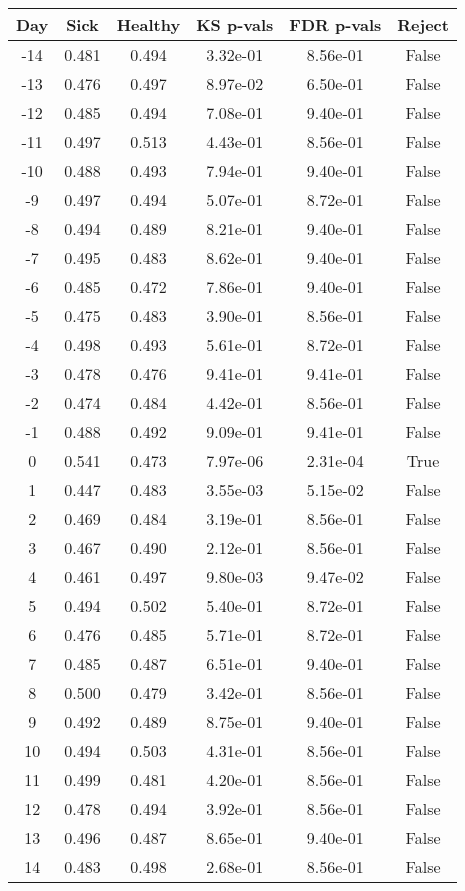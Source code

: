 \begin{tabular}{c|c|c|c|c|c}
Day &  Sick & Healthy &  KS p-vals & FDR p-vals & Reject\\
\hline
-14 & 0.481 &   0.494 &   3.32e-01 &   8.56e-01 &  False\\
-13 & 0.476 &   0.497 &   8.97e-02 &   6.50e-01 &  False\\
-12 & 0.485 &   0.494 &   7.08e-01 &   9.40e-01 &  False\\
-11 & 0.497 &   0.513 &   4.43e-01 &   8.56e-01 &  False\\
-10 & 0.488 &   0.493 &   7.94e-01 &   9.40e-01 &  False\\
 -9 & 0.497 &   0.494 &   5.07e-01 &   8.72e-01 &  False\\
 -8 & 0.494 &   0.489 &   8.21e-01 &   9.40e-01 &  False\\
 -7 & 0.495 &   0.483 &   8.62e-01 &   9.40e-01 &  False\\
 -6 & 0.485 &   0.472 &   7.86e-01 &   9.40e-01 &  False\\
 -5 & 0.475 &   0.483 &   3.90e-01 &   8.56e-01 &  False\\
 -4 & 0.498 &   0.493 &   5.61e-01 &   8.72e-01 &  False\\
 -3 & 0.478 &   0.476 &   9.41e-01 &   9.41e-01 &  False\\
 -2 & 0.474 &   0.484 &   4.42e-01 &   8.56e-01 &  False\\
 -1 & 0.488 &   0.492 &   9.09e-01 &   9.41e-01 &  False\\
  0 & 0.541 &   0.473 &   7.97e-06 &   2.31e-04 &   True\\
  1 & 0.447 &   0.483 &   3.55e-03 &   5.15e-02 &  False\\
  2 & 0.469 &   0.484 &   3.19e-01 &   8.56e-01 &  False\\
  3 & 0.467 &   0.490 &   2.12e-01 &   8.56e-01 &  False\\
  4 & 0.461 &   0.497 &   9.80e-03 &   9.47e-02 &  False\\
  5 & 0.494 &   0.502 &   5.40e-01 &   8.72e-01 &  False\\
  6 & 0.476 &   0.485 &   5.71e-01 &   8.72e-01 &  False\\
  7 & 0.485 &   0.487 &   6.51e-01 &   9.40e-01 &  False\\
  8 & 0.500 &   0.479 &   3.42e-01 &   8.56e-01 &  False\\
  9 & 0.492 &   0.489 &   8.75e-01 &   9.40e-01 &  False\\
 10 & 0.494 &   0.503 &   4.31e-01 &   8.56e-01 &  False\\
 11 & 0.499 &   0.481 &   4.20e-01 &   8.56e-01 &  False\\
 12 & 0.478 &   0.494 &   3.92e-01 &   8.56e-01 &  False\\
 13 & 0.496 &   0.487 &   8.65e-01 &   9.40e-01 &  False\\
 14 & 0.483 &   0.498 &   2.68e-01 &   8.56e-01 &  False\\
\end{tabular}